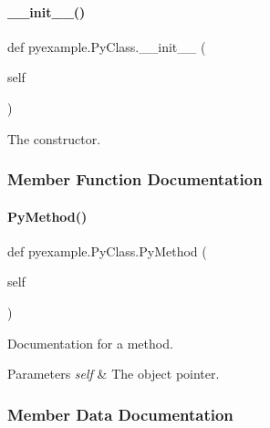 \paragraph{\texorpdfstring{\+\_\+\+\_\+init\+\_\+\+\_\+()}{\_\_init\_\_()}}
{\footnotesize\ttfamily def pyexample.\+Py\+Class.\+\_\+\+\_\+init\+\_\+\+\_\+ (\begin{DoxyParamCaption}\item[{}]{self }\end{DoxyParamCaption})}



The constructor. 



\subsubsection{Member Function Documentation}
\mbox{\label{classpyexample_1_1_py_class_a654596774eb28a0c6d26eea565de3a9d}} 
\paragraph{\texorpdfstring{Py\+Method()}{PyMethod()}}
{\footnotesize\ttfamily def pyexample.\+Py\+Class.\+Py\+Method (\begin{DoxyParamCaption}\item[{}]{self }\end{DoxyParamCaption})}



Documentation for a method. 


\begin{DoxyParams}{Parameters}
{\em self} & The object pointer. \\
\hline
\end{DoxyParams}


\subsubsection{Member Data Documentation}
\mbox{\label{classpyexample_1_1_py_class_abd17aff54e5b0ca194020c796c733546}} 
